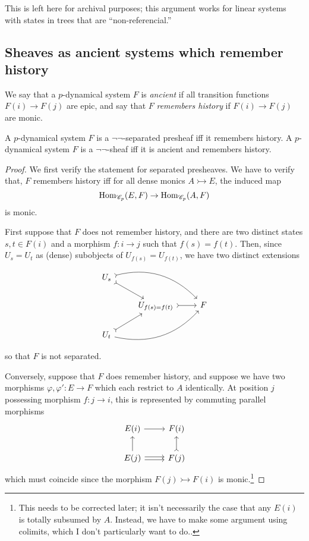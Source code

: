 \documentclass{amsart}
\begin{document}
{\color{magenta}
  This is left here for archival purposes;
  this argument works for linear systems with states in trees that are ``non-referencial.''
\subsection{Sheaves as ancient systems which remember history}
We say that a $p$-dynamical system $F$ is \emph{ancient} if all transition functions $F(i) \rightarrow F(j)$ are epic, and say that $F$ \emph{remembers history} if $F(i) \rightarrow F(j)$ are monic.
\begin{proposition}
  A $p$-dynamical system $F$ is a $\neg\neg$-separated presheaf iff it remembers history.
  A $p$-dynamical system $F$ is a $\neg\neg$-sheaf iff it is ancient and remembers history.
\end{proposition}
\begin{proof}
  We first verify the statement for separated presheaves.
  We have to verify that, $F$ remembers history iff for all dense monics $A \rightarrowtail E$, the induced map
  \[
    \operatorname{Hom}_{\mathscr{C}_p}(E,F) \rightarrow \operatorname{Hom}_{\mathscr{C}_p}(A,F)
  \]
  is monic.

  First suppose that $F$ does not remember history, and there are two distinct states $s,t \in F(i)$ and a morphism $f:i \rightarrow j$ such that $f(s) = f(t)$.
  Then, since $U_s = U_t$ as (dense) subobjects of $U_{f(s)} = U_{f(t)}$, we have two distinct extensions
  \[
    \begin{tikzcd}
      U_{s} \arrow[rd,tail] \arrow[rrd,tail, bend left]\\
      & U_{f(s) = f(t)} \arrow[r,tail]& F\\
      U_{t} \arrow[ru,tail] \arrow[rru, bend right]
    \end{tikzcd}
  \]
  so that $F$ is not separated.

  Conversely, suppose that $F$ does remember history, and suppose we have two morphisms $\varphi,\varphi':E \rightarrow F$ which each restrict to $A$ identically.
  At position $j$ possessing morphism $f:j \rightarrow i$, this is represented by commuting parallel morphisms 
  \[
    \begin{tikzcd}
      E(i) \arrow[r]
      & F(i)\\
      E(j) \arrow[u] \arrow[r, transform canvas={yshift = .4ex}]  \arrow[r, transform canvas={yshift = -.4ex}]
      & F(j) \arrow[u,tail]
    \end{tikzcd}
  \]
  which must coincide since the morphism $F(j) \rightarrowtail F(i)$ is monic.\footnote{\color{magenta} This needs to be corrected later;
it isn't necessarily the case that any $E(i)$ is totally subsumed by $A$.
Instead, we have to make some argument using colimits, which I don't particularly want to do..}


\end{proof}}
\end{document}
